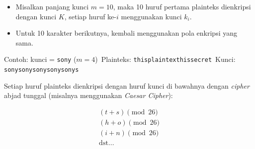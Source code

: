 \documentclass{article}
\begin{document}

\begin{itemize}
    \item Misalkan panjang kunci $m = 10$, maka 10 huruf pertama plainteks dienkripsi dengan kunci $K$, setiap huruf ke-$i$ menggunakan kunci $k_i$.
    \item Untuk 10 karakter berikutnya, kembali menggunakan pola enkripsi yang sama.
\end{itemize}

\noindent Contoh: kunci = \texttt{sony} \quad ($m = 4$)\
Plainteks: \texttt{thisplaintexthissecret}\
Kunci: \texttt{sonysonysonysonysonys}

\vspace{5mm}

Setiap huruf plainteks dienkripsi dengan huruf kunci di bawahnya dengan \textit{cipher} abjad tunggal (misalnya menggunakan \textit{Caesar Cipher}):

\begin{align*}
    (t+s) \pmod{26} \\
    (h + o) \pmod{26} \\
    (i + n) \pmod{26} \\
    \text{dst...}
\end{align*}
\end{document}
